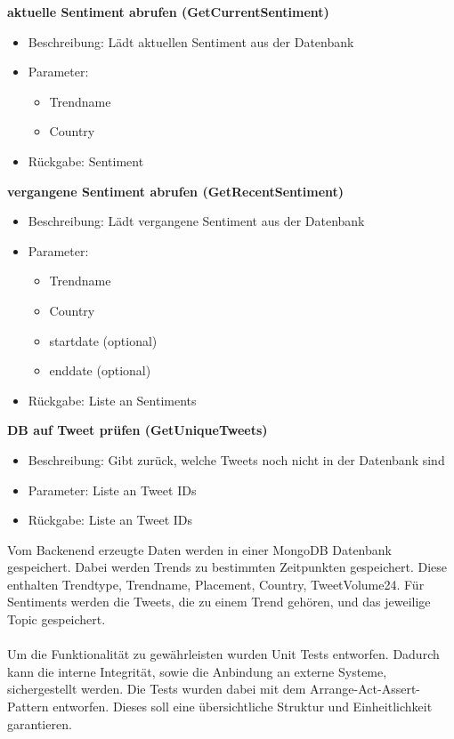 \documentclass[conference]{IEEEtran}
\begin{document}
\smallskip
\textbf{aktuelle Sentiment abrufen (GetCurrentSentiment)}
\begin{itemize}
    \item Beschreibung: Lädt aktuellen Sentiment aus der Datenbank
    \item Parameter:
          \begin{itemize}
              \item Trendname
              \item Country
          \end{itemize}
    \item Rückgabe: Sentiment
\end{itemize}

\smallskip
\textbf{vergangene Sentiment abrufen (GetRecentSentiment)}
\begin{itemize}
    \item Beschreibung: Lädt vergangene Sentiment aus der Datenbank
    \item Parameter:
          \begin{itemize}
              \item Trendname
              \item Country
              \item startdate (optional)
              \item enddate (optional)
          \end{itemize}
    \item Rückgabe: Liste an Sentiments
\end{itemize}

\smallskip
\textbf{DB auf Tweet prüfen (GetUniqueTweets)}
\begin{itemize}
    \item Beschreibung: Gibt zurück, welche Tweets noch nicht in der Datenbank sind
    \item Parameter: Liste an Tweet IDs
    \item Rückgabe: Liste an Tweet IDs
\end{itemize}


\smallskip

Vom Backenend erzeugte Daten werden in einer MongoDB Datenbank gespeichert.
Dabei werden Trends zu bestimmten Zeitpunkten gespeichert. Diese enthalten Trendtype, Trendname, Placement, Country, TweetVolume24. Für Sentiments werden die Tweets, die zu einem Trend gehören, und das jeweilige Topic gespeichert.
\\
\\
Um die Funktionalität zu gewährleisten wurden Unit Tests entworfen. Dadurch kann die interne Integrität, sowie die Anbindung an externe Systeme,
sichergestellt werden. Die Tests wurden dabei mit dem Arrange-Act-Assert-Pattern entworfen. Dieses soll eine
übersichtliche Struktur und Einheitlichkeit garantieren.
\end{document}
